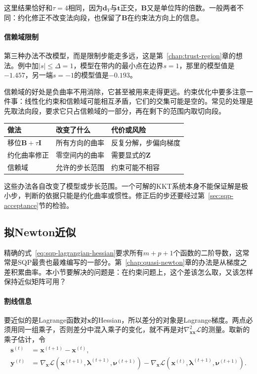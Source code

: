 这里结果恰好和$\tau=4$相同，因为$\bm{d}_Y$与$\bm{t}$正交，$\bm{B}$又是单位阵的倍数。一般两者不同：约化修正不改变法向段，也保留了$\bm{B}$在约束法方向上的信息。

\paragraph{信赖域限制}
第三种办法不改模型，而是限制步能走多远，这是第~\ref{chap:trust-region}章的想法。例中加$\lvert s\rvert\leq\Delta=1$，模型在带内的最小点在边界$s=1$，那里的模型值是$-1.457$，另一端$s=-1$的模型值是$-0.193$。

信赖域的好处是负曲率不用消除，它甚至被用来走得更远。约束优化中要多注意一件事：线性化约束和信赖域可能相互矛盾，它们的交集可能是空的。常见的处理是先取法向段，要求它只占信赖域的一部分，再在剩下的范围内取切向段。

\begin{BookInlineTable}
 \centering
 \begin{tabular}{lll}
  \toprule
  做法 & 改变了什么 & 代价或风险\\
  \midrule
  移位$\bm{B}+\tau\bm{I}$ & 所有方向的曲率 & 反复分解，步偏向梯度\\
  约化曲率修正 & 零空间内的曲率 & 需要显式的$\bm{Z}$\\
  信赖域 & 允许的步长范围 & 约束可能不相容\\
  \bottomrule
 \end{tabular}
 \caption{处理负曲率的三类办法。}
 \label{tab:sqp-modification}
\end{BookInlineTable}

这些办法各自改变了模型或步长范围。一个可解的KKT系统本身不能保证解是极小步，判断的依据只能是约化曲率或惯性。修正后的步还要经过第~\ref{sec:sqp-acceptance}节的检验。

\subsection{拟Newton近似}
\label{sec:sqp-quasi-newton}

精确的式~\eqref{eq:sqp-lagrangian-hessian}要求所有$m+p+1$个函数的二阶导数，这常常是SQP最贵也最难编写的一部分。第~\ref{chap:quasi-newton}章的办法是从梯度之差积累曲率。本小节要解决的问题是：在约束问题上，这个差该怎么取，又该怎样保持近似矩阵可用？

\paragraph{割线信息}
要近似的是Lagrange函数对$\bm{x}$的Hessian，所以差分的对象是Lagrange梯度。两点必须用同一组乘子，否则差分中混入乘子的变化，就不再是对$\nabla^2_{\bm{x}\bm{x}}\mathcal{L}$的测量。取新的乘子估计，令
\begin{equation}
 \begin{aligned}
 \bm{s}^{(t)}&=\bm{x}^{(t+1)}-\bm{x}^{(t)},\\
 \bm{y}^{(t)}&=\nabla_{\bm{x}}\mathcal{L}(\bm{x}^{(t+1)},\bm{\lambda}^{(t+1)},\bm{\nu}^{(t+1)})
 -\nabla_{\bm{x}}\mathcal{L}(\bm{x}^{(t)},\bm{\lambda}^{(t+1)},\bm{\nu}^{(t+1)}).
 \end{aligned}
 \label{eq:sqp-secant-pair}
\end{equation}

